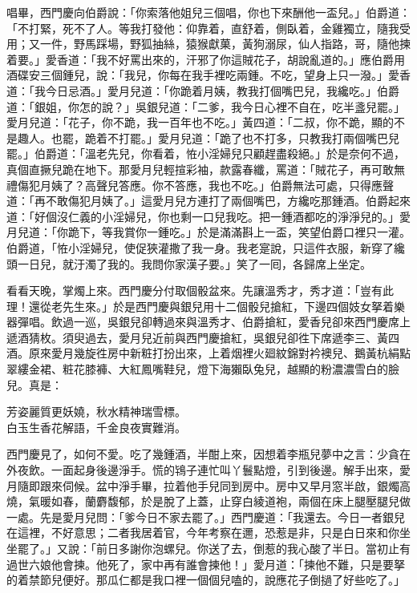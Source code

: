 唱畢，西門慶向伯爵說：「你索落他姐兒三個唱，你也下來酬他一盃兒。」伯爵道：「不打緊，死不了人。等我打發他：仰靠着，直舒着，側臥着，金雞獨立，隨我受用；又一件，野馬踩場，野狐抽絲，猿猴獻菓，黃狗溺尿，仙人指路，哥，隨他揀着要。」{}愛香道：「我不好罵出來的，汗邪了你這賊花子，胡說亂道的。」應伯爵用酒碟安三個鍾兒，說：「我兒，你每在我手裡吃兩鍾。不吃，望身上只一潑。」愛香道：「我今日忌酒。」愛月兒道：「你跪着月姨，教我打個嘴巴兒，我纔吃。」伯爵道：「銀姐，你怎的說？」吳銀兒道：「二爹，我今日心裡不自在，吃半盞兒罷。」愛月兒道：「花子，你不跪，我一百年也不吃。」黃四道：「二叔，你不跪，顯的不是趣人。也罷，跪着不打罷。」愛月兒道：「跪了也不打多，只教我打兩個嘴巴兒罷。」伯爵道：「溫老先兒，你看着，恠小淫婦兒只顧趕盡殺絕。」於是奈何不過，真個直撅兒跪在地下。那愛月兒輕揎彩袖，款露春纖，罵道：「賊花子，再可敢無禮傷犯月姨了？高聲兒答應。你不答應，我也不吃。」伯爵無法可處，只得應聲道：「再不敢傷犯月姨了。」這愛月兒方連打了兩個嘴巴，方纔吃那鍾酒。{}伯爵起來道：「好個沒仁義的小淫婦兒，你也剩一口兒我吃。把一鍾酒都吃的淨淨兒的。」愛月兒道：「你跪下，等我賞你一鍾吃。」於是滿滿斟上一盃，笑望伯爵口裡只一灌。伯爵道，「恠小淫婦兒，使促狹灌撒了我一身。我老寔說，只這件衣服，新穿了纔頭一日兒，就汙濁了我的。我問你家漢子要。」{}笑了一囘，各歸席上坐定。

看看天晚，掌燭上來。西門慶分付取個骰盆來。先讓溫秀才，秀才道：「豈有此理！還從老先生來。」於是西門慶與銀兒用十二個骰兒搶紅，下邊四個妓女拏着樂器彈唱。飲過一巡，吳銀兒卻轉過來與溫秀才、伯爵搶紅，愛香兒卻來西門慶席上遞酒猜枚。須臾過去，愛月兒近前與西門慶搶紅，吳銀兒卻徃下席遞李三、黃四酒。原來愛月幾旋徃房中新粧打扮出來，上着烟裡火廻紋錦對衿襖兒、鵝黃杭絹點翠縷金裙、粧花膝褲、大紅鳳嘴鞋兒，燈下海獺臥兔兒，越顯的粉濃濃雪白的臉兒。真是：

\begin{myquote} 
芳姿麗質更妖嬈，秋水精神瑞雪標。\\白玉生香花解語，千金良夜實難消。
\end{myquote} 

西門慶見了，如何不愛。吃了幾鍾酒，半酣上來，因想着李瓶兒夢中之言：少貪在外夜飲。一面起身後邊淨手。慌的鴇子連忙叫丫鬟點燈，引到後邊。解手出來，愛月隨即跟來伺候。盆中淨手畢，拉着他手兒同到房中。房中又早月窓半啟，銀燭高燒，氣暖如春，蘭麝馥郁，於是脫了上蓋，止穿白綾道袍，兩個在床上腿壓腿兒做一處。先是愛月兒問：「爹今日不家去罷了。」西門慶道：「我還去。今日一者銀兒在這裡，不好意思；二者我居着官，今年考察在邇，恐惹是非，只是白日來和你坐坐罷了。」又說：「前日多謝你泡螺兒。你送了去，倒惹的我心酸了半日。當初止有過世六娘他會揀。他死了，家中再有誰會揀他！」{}愛月道：「揀他不難，只是要拏的着禁節兒便好。那瓜仁都是我口裡一個個兒嗑的，說應花子倒撾了好些吃了。」

